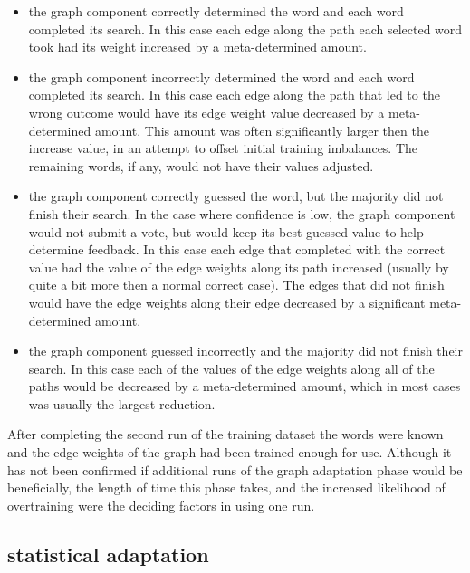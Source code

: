 \begin{itemize}      
	\item the graph component correctly determined the word and each word 
	completed its search.  In this case each edge along the path each selected 
	word took had its weight increased by a meta-determined amount.
	\item the graph component incorrectly determined the word and each word 
	completed its search. In this case each edge along the path that led to the 
	wrong outcome would have its edge weight value decreased by a 
	meta-determined amount. This amount was often significantly larger then the 
	increase value, in an attempt to offset initial training imbalances. The 
	remaining words, if any, would not have their values adjusted.     
	\item the graph component correctly guessed the word, but the majority did 
	not finish their search. In the case where confidence is low, the graph 
	component would not submit a vote, but would keep its best guessed value to 
	help determine feedback. In this case each edge that completed with the 
	correct value had the value of the edge weights along its path increased 
	(usually by quite a bit more then a normal correct case). The edges that did 
	not finish would have the edge weights along their edge decreased by a 
	significant meta-determined amount.     
	\item the graph component guessed incorrectly and the majority did not 
	finish their search. In this case each of the values of the edge weights 
	along all of the paths would be decreased by a meta-determined amount, which 
	in most cases was usually the largest reduction. 
\end{itemize}

After completing the second run of the training dataset the words were known and
the edge-weights of the graph had been trained enough for use.  Although it has
not been confirmed if additional runs of the graph adaptation phase would be
beneficially, the length of time this phase takes, and the increased likelihood
of overtraining were the deciding factors in using one run.

\subsection{statistical adaptation}

